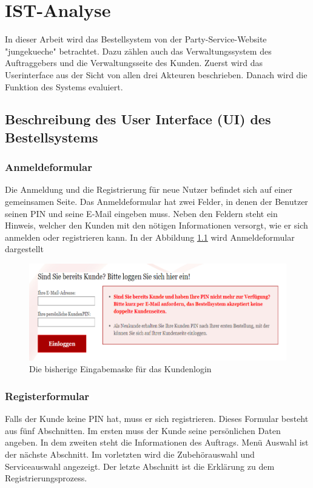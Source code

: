 \chapter{IST-Analyse}
In dieser Arbeit wird das Bestellsystem von der Party-Service-Website "jungekueche" betrachtet. Dazu zählen auch das Verwaltungssystem des Auftraggebers und die Verwaltungsseite des Kunden. Zuerst wird das Userinterface aus der Sicht von allen drei Akteuren beschrieben. Danach wird die Funktion des Systems evaluiert.

\section{Beschreibung des User Interface (UI) des Bestellsystems} 

\subsection{Anmeldeformular}
Die Anmeldung und die Registrierung für neue Nutzer befindet sich auf einer gemeinsamen Seite. 
Das Anmeldeformular hat zwei Felder, in denen der Benutzer seinen PIN und seine E-Mail eingeben muss. Neben den Feldern steht ein Hinweis, welcher den Kunden mit den nötigen Informationen versorgt, wie er sich anmelden oder registrieren kann. In der Abbildung \ref{fig:anmeldeformular} wird Anmeldeformular dargestellt 


\begin{figure}[h]
	\centering
	\includegraphics[width=0.7\linewidth]{Graphics/anmeldeformular.png}
	\caption[Anmeldeformular]{Die bisherige Eingabemaske für das Kundenlogin}
	\label{fig:anmeldeformular}
\end{figure}


\subsection{Registerformular}

Falls der Kunde keine PIN hat, muss er sich registrieren. Dieses Formular besteht aus fünf Abschnitten. Im ersten muss der Kunde seine persönlichen Daten angeben. In dem zweiten steht die Informationen des Auftrags. Menü Auswahl ist der nächste Abschnitt. Im vorletzten wird die Zubehörauswahl und Serviceauswahl angezeigt. Der letzte Abschnitt ist die Erklärung zu dem Registrierungsprozess. 

